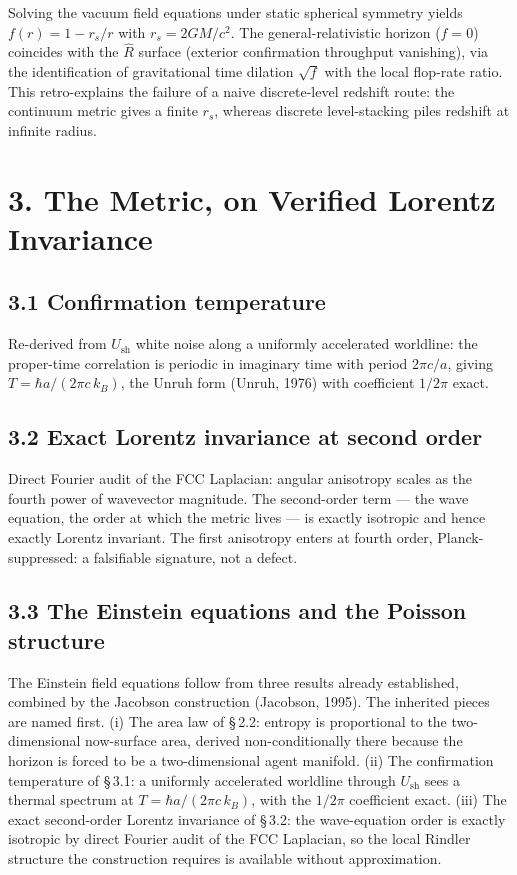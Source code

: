 \documentclass[11pt,oneside]{report}
\theoremstyle{definition}
\theoremstyle{remark}
\begin{document}
Solving the vacuum field equations under static spherical symmetry yields
\ensuremath{f(r) = 1 - r_s/r} with \ensuremath{r_s = 2GM/c^2}. The
general-relativistic horizon (\ensuremath{f = 0}) coincides with the
\ensuremath{\hat{R}} surface (exterior confirmation throughput vanishing),
via the identification of gravitational time dilation \ensuremath{\sqrt{f}}
with the local flop-rate ratio. This retro-explains the failure of a
naive discrete-level redshift route: the continuum metric gives a finite
\ensuremath{r_s}, whereas discrete level-stacking piles redshift at
infinite radius.

\section*{3. The Metric, on Verified Lorentz Invariance}

\subsection*{3.1 Confirmation temperature}

Re-derived from \ensuremath{U_{\mathrm{sh}}} white noise along a uniformly
accelerated worldline: the proper-time correlation is periodic in
imaginary time with period \ensuremath{2\pi c/a}, giving \ensuremath{T =
\hbar a/(2\pi c\, k_B)}, the Unruh form (Unruh, 1976) with coefficient \ensuremath{1/2\pi} exact.

\subsection*{3.2 Exact Lorentz invariance at second order}

Direct Fourier audit of the FCC Laplacian: angular anisotropy scales as
the fourth power of wavevector magnitude. The second-order term --- the
wave equation, the order at which the metric lives --- is exactly
isotropic and hence exactly Lorentz invariant. The first anisotropy
enters at fourth order, Planck-suppressed: a falsifiable signature, not a
defect.

\subsection*{3.3 The Einstein equations and the Poisson structure}

The Einstein field equations follow from three results already
established, combined by the Jacobson construction (Jacobson, 1995). The inherited pieces
are named first. (i) The area law of \S\,2.2: entropy is proportional to
the two-dimensional now-surface area, derived non-conditionally there
because the horizon is forced to be a two-dimensional agent manifold.
(ii) The confirmation temperature of \S\,3.1: a uniformly accelerated
worldline through \ensuremath{U_{\mathrm{sh}}} sees a thermal spectrum at
\ensuremath{T = \hbar a/(2\pi c\, k_B)}, with the \ensuremath{1/2\pi}
coefficient exact. (iii) The exact second-order Lorentz invariance of
\S\,3.2: the wave-equation order is exactly isotropic by direct Fourier
audit of the FCC Laplacian, so the local Rindler structure the
construction requires is available without approximation.
\end{document}
